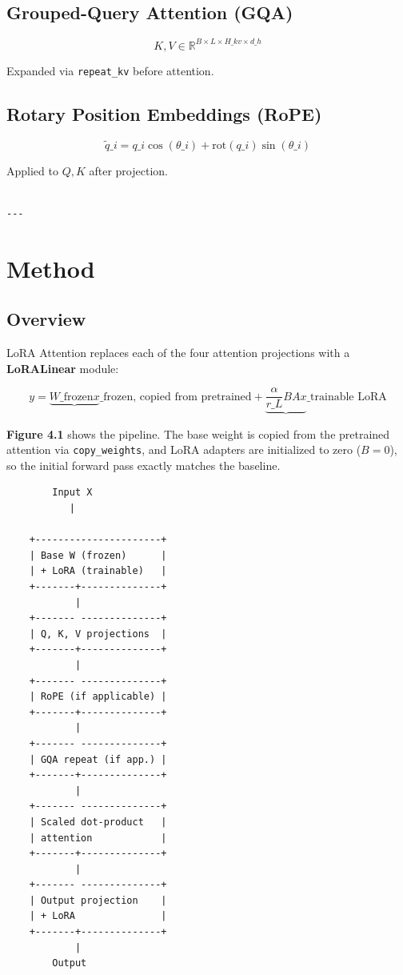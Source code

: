 \subsection{Grouped-Query Attention (GQA)}

\[
K, V \in \mathbb{R}^{B \times L \times H\_{kv} \times d\_h}
\tag{3.7}
\]

Expanded via \texttt{repeat\_kv} before attention.

\subsection{Rotary Position Embeddings (RoPE)}

\[
\tilde{q}\_i = q\_i \cos(\theta\_i) + \text{rot}(q\_i) \sin(\theta\_i)
\tag{3.8}
\]

Applied to $Q, K$ after projection.
\begin{lstlisting}

---
\end{lstlisting}

\section{Method}

\subsection{Overview}

LoRA Attention replaces each of the four attention projections with a 
\textbf{LoRALinear} module:

\[
y = \underbrace{W\_\text{frozen} x}\_{\text{frozen, copied from pretrained}} + 
    \underbrace{\frac{\alpha}{r\_L} B A x}\_{\text{trainable LoRA}}
\tag{4.1}
\]

\textbf{Figure 4.1} shows the pipeline. The base weight is copied from the 
pretrained attention via \texttt{copy\_weights}, and LoRA adapters are initialized 
to zero ($B = 0$), so the initial forward pass exactly matches the baseline.

\begin{lstlisting}
        Input X
           |
            
    +----------------------+
    | Base W (frozen)      |
    | + LoRA (trainable)   |
    +-------+--------------+
            |
    +------- --------------+
    | Q, K, V projections  |
    +-------+--------------+
            |
    +------- --------------+
    | RoPE (if applicable) |
    +-------+--------------+
            |
    +------- --------------+
    | GQA repeat (if app.) |
    +-------+--------------+
            |
    +------- --------------+
    | Scaled dot-product   |
    | attention            |
    +-------+--------------+
            |
    +------- --------------+
    | Output projection    |
    | + LoRA               |
    +-------+--------------+
            |
        Output
\end{lstlisting}

